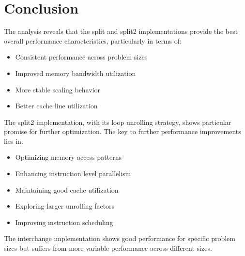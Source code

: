 \documentclass[11pt,a4paper]{article}
\begin{document}
\section{Conclusion}
The analysis reveals that the split and split2 implementations provide the best overall performance characteristics, particularly in terms of:
\begin{itemize}
    \item Consistent performance across problem sizes
    \item Improved memory bandwidth utilization
    \item More stable scaling behavior
    \item Better cache line utilization
\end{itemize}

The split2 implementation, with its loop unrolling strategy, shows particular promise for further optimization. The key to further performance improvements lies in:
\begin{itemize}
    \item Optimizing memory access patterns
    \item Enhancing instruction level parallelism
    \item Maintaining good cache utilization
    \item Exploring larger unrolling factors
    \item Improving instruction scheduling
\end{itemize}

The interchange implementation shows good performance for specific problem sizes but suffers from more variable performance across different sizes.
\end{document}
